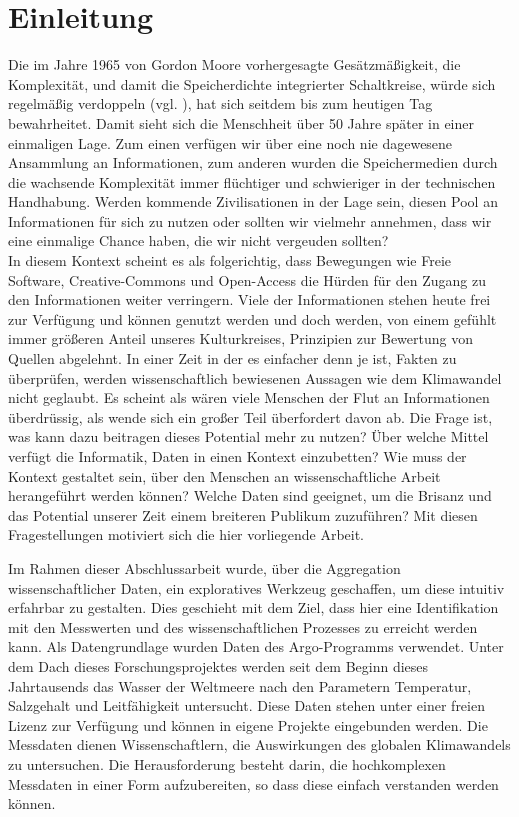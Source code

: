 
\section{Einleitung}


Die im Jahre 1965 von Gordon Moore vorhergesagte Gesätzmäßigkeit, die Komplexität, und damit die Speicherdichte integrierter Schaltkreise, würde sich regelmäßig verdoppeln (vgl. \cite{moore1998cramming}),  hat sich seitdem bis zum heutigen Tag bewahrheitet. Damit sieht sich die Menschheit über 50 Jahre später in einer einmaligen Lage. 
Zum einen verfügen wir über eine noch nie dagewesene Ansammlung an Informationen, zum anderen wurden die Speichermedien durch die wachsende Komplexität immer flüchtiger und schwieriger in der technischen Handhabung. Werden kommende Zivilisationen in der Lage sein, diesen Pool an Informationen für sich zu nutzen oder sollten wir vielmehr annehmen, dass wir eine einmalige Chance haben, die wir nicht vergeuden sollten? \\

In diesem Kontext scheint es als folgerichtig, dass Bewegungen wie Freie Software, Creative-Commons und Open-Access die Hürden für den Zugang zu den Informationen weiter verringern.  Viele der Informationen stehen heute frei zur Verfügung und können genutzt werden und doch werden, von einem gefühlt immer größeren Anteil unseres Kulturkreises, Prinzipien zur Bewertung von Quellen abgelehnt. 
In einer Zeit in der es einfacher denn je ist, Fakten zu überprüfen, werden wissenschaftlich bewiesenen Aussagen wie dem Klimawandel  nicht geglaubt.
Es scheint als wären viele Menschen der Flut an Informationen überdrüssig, als wende sich ein großer Teil überfordert davon ab.
Die Frage ist, was kann dazu beitragen dieses Potential mehr zu nutzen? 
Über welche Mittel verfügt die Informatik, Daten in einen Kontext einzubetten? Wie muss der Kontext gestaltet sein, über den Menschen an  wissenschaftliche Arbeit herangeführt werden können? Welche Daten sind geeignet, um die Brisanz und das Potential unserer Zeit einem breiteren Publikum zuzuführen? 
Mit diesen Fragestellungen motiviert sich die hier vorliegende Arbeit.

Im Rahmen dieser Abschlussarbeit wurde, über die Aggregation wissenschaftlicher Daten, ein exploratives Werkzeug geschaffen, um diese intuitiv erfahrbar zu gestalten. Dies geschieht mit dem Ziel, dass hier eine Identifikation mit den Messwerten und des wissenschaftlichen Prozesses zu erreicht werden kann. Als Datengrundlage wurden Daten des Argo-Programms verwendet. Unter dem Dach dieses Forschungsprojektes werden seit dem Beginn dieses Jahrtausends das Wasser der Weltmeere nach den Parametern Temperatur, Salzgehalt und Leitfähigkeit untersucht. Diese Daten stehen unter einer freien Lizenz zur Verfügung und können in eigene Projekte eingebunden werden.  Die Messdaten dienen Wissenschaftlern, die Auswirkungen des globalen Klimawandels zu untersuchen. Die Herausforderung besteht darin, die  hochkomplexen Messdaten in einer Form aufzubereiten, so dass diese einfach verstanden werden können.\\



